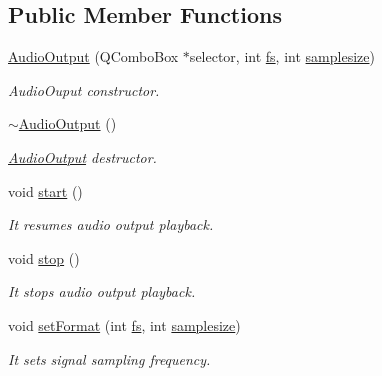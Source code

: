 \subsection*{Public Member Functions}
\begin{DoxyCompactItemize}
\item 
\hyperlink{class_audio_output_afd879db4e79ccc430bd9d9a795534323}{Audio\+Output} (Q\+Combo\+Box $\ast$selector, int \hyperlink{class_audio_output_ac2a46ded8a978627b8af81458a714ef3}{fs}, int \hyperlink{class_audio_output_aac9c297a839bb25c1232fc5adcce6cab}{samplesize})
\begin{DoxyCompactList}\small\item\em Audio\+Ouput constructor. \end{DoxyCompactList}\item 
\mbox{\label{class_audio_output_a95719dfdce3899ee2847e20dc403e25e}} 
\hyperlink{class_audio_output_a95719dfdce3899ee2847e20dc403e25e}{$\sim$\+Audio\+Output} ()
\begin{DoxyCompactList}\small\item\em \hyperlink{class_audio_output}{Audio\+Output} destructor. \end{DoxyCompactList}\item 
\mbox{\label{class_audio_output_a686dd972cb2043552063b34ae67eaadc}} 
void \hyperlink{class_audio_output_a686dd972cb2043552063b34ae67eaadc}{start} ()
\begin{DoxyCompactList}\small\item\em It resumes audio output playback. \end{DoxyCompactList}\item 
\mbox{\label{class_audio_output_a3f4858aa5c581613e32b30ee6c5339a6}} 
void \hyperlink{class_audio_output_a3f4858aa5c581613e32b30ee6c5339a6}{stop} ()
\begin{DoxyCompactList}\small\item\em It stops audio output playback. \end{DoxyCompactList}\item 
void \hyperlink{class_audio_output_a467f6e31cf89b89e9986caa05ec7fe62}{set\+Format} (int \hyperlink{class_audio_output_ac2a46ded8a978627b8af81458a714ef3}{fs}, int \hyperlink{class_audio_output_aac9c297a839bb25c1232fc5adcce6cab}{samplesize})
\begin{DoxyCompactList}\small\item\em It sets signal sampling frequency. \end{DoxyCompactList}\item 

\end{DoxyCompactItemize}
